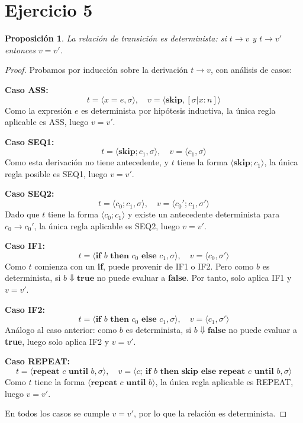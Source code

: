 \documentclass{article}
\newtheorem{proposition}{Proposición}
\begin{document}
\section*{Ejercicio 5}

\begin{proposition}
La relación de transición es determinista: si $t \to v$ y $t \to v'$ entonces $v = v'$.
\end{proposition}

\begin{proof}
Probamos por inducción sobre la derivación $t \to v$, con análisis de casos:

\textbf{Caso ASS:}  
\[
t = \langle x = e, \sigma \rangle, \quad v = \langle \textbf{skip}, [\sigma | x : n] \rangle
\]  
Como la expresión $e$ es determinista por hipótesis inductiva, la única regla aplicable es \textsc{ASS}, luego $v = v'$.

\textbf{Caso SEQ1:}  
\[
t = \langle \textbf{skip}; c_1, \sigma \rangle, \quad v = \langle c_1, \sigma \rangle
\]  
Como esta derivación no tiene antecedente, y $t$ tiene la forma $\langle \textbf{skip}; c_1 \rangle$, la única regla posible es \textsc{SEQ1}, luego $v = v'$.

\textbf{Caso SEQ2:}  
\[
t = \langle c_0; c_1, \sigma \rangle, \quad v = \langle c_0'; c_1, \sigma' \rangle
\]  
Dado que $t$ tiene la forma $\langle c_0; c_1 \rangle$ y existe un antecedente determinista para $c_0 \to c_0'$, la única regla aplicable es \textsc{SEQ2}, luego $v = v'$.

\textbf{Caso IF1:}  
\[
t = \langle \textbf{if } b \textbf{ then } c_0 \textbf{ else } c_1, \sigma \rangle, 
\quad v = \langle c_0, \sigma' \rangle
\]  
Como $t$ comienza con un \textbf{if}, puede provenir de \textsc{IF1} o \textsc{IF2}.  
Pero como $b$ es determinista, si $b \Downarrow \textbf{true}$ no puede evaluar a \textbf{false}. Por tanto, solo aplica \textsc{IF1} y $v = v'$.

\textbf{Caso IF2:}  
\[
t = \langle \textbf{if } b \textbf{ then } c_0 \textbf{ else } c_1, \sigma \rangle, 
\quad v = \langle c_1, \sigma' \rangle
\]  
Análogo al caso anterior: como $b$ es determinista, si $b \Downarrow \textbf{false}$ no puede evaluar a \textbf{true}, luego solo aplica \textsc{IF2} y $v = v'$.

\textbf{Caso REPEAT:}  
\[
t = \langle \textbf{repeat } c \textbf{ until } b, \sigma \rangle, 
\quad v = \langle c;\ \textbf{if } b \textbf{ then skip else repeat } c \textbf{ until } b, \sigma \rangle
\]  
Como $t$ tiene la forma $\langle \textbf{repeat } c \textbf{ until } b \rangle$, la única regla aplicable es \textsc{REPEAT}, luego $v = v'$.

En todos los casos se cumple $v = v'$, por lo que la relación es determinista.
\end{proof}
\end{document}

